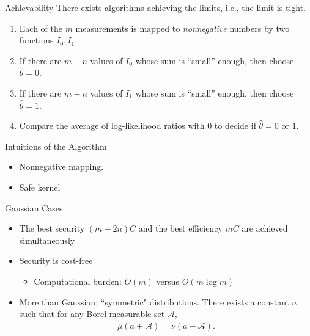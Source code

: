 \documentclass[10pt]{beamer}
\newlength\figureheight
\newlength\figurewidth
\newcommand{\tikzdir}[1]{#1.tikz}
\newcommand{\inputtikz}[1]{}}
\begin{document}
\begin{frame}{Achievability}
 There exists algorithms achieving the limits, i.e., the limit is tight.
   \begin{enumerate}
   \item Each of the $m$ measurements is mapped to \emph{nonnegative} numbers by two functions $I_0,I_1$.
  \item If there are $m-n$ values of $I_0$ whose sum is ``small'' enough, then choose $\hat \theta = 0$.
  \item If there are $m-n$ values of $I_1$ whose sum is ``small'' enough, then choose $\hat \theta = 1$.
  \item Compare the average of log-likelihood ratios with 0 to decide if $\hat \theta = 0$ or $1$.
  \end{enumerate}
\end{frame}


\begin{frame}{Intuitions of the Algorithm}
 \begin{itemize}
   \item  Nonnegative mapping.
     \begin{center}
    \setlength{\figureheight}{2cm}
    \setlength{\figurewidth}{10cm}
    \inputtikz{nonnegative}
  \end{center}
  \item Safe kernel
       \begin{center}
    \setlength{\figureheight}{2cm}
    \setlength{\figurewidth}{10cm}
    \inputtikz{safekernel}
  \end{center}
  \end{itemize}
\end{frame}






\begin{frame}{Gaussian Cases}
\begin{itemize}
\item The best security $(m-2n)C$ and the best efficiency $mC$ are achieved simultaneously
\item Security is cost-free
\begin{itemize}
  \item Computational burden: $O(m)$ versus $O(m\log m)$
\end{itemize}
\item More than Gaussian: ``symmetric" distributions. There exists a constant $a$ such that for any Borel measurable set $\mathcal A$,
\begin{align*}
  \mu(a+\mathcal A) = \nu (a-\mathcal A).
\end{align*}
\end{itemize}
\end{frame}
\end{document}

